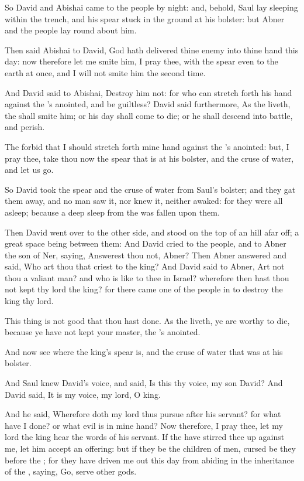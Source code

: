 \verse So David and Abishai came to the people by night: and, behold, Saul lay sleeping within the trench, and his spear stuck in the ground at his bolster: but Abner and the people lay round about him.

\verse Then said Abishai to David, God hath delivered thine enemy into thine hand this day: now therefore let me smite him, I pray thee, with the spear even to the earth at once, and I will not smite him the second time.

\verse And David said to Abishai, Destroy him not: for who can stretch forth his hand against the \LORD's anointed, and be guiltless?  \verse David said furthermore, As the \LORD liveth, the \LORD shall smite him; or his day shall come to die; or he shall descend into battle, and perish.

\verse The \LORD forbid that I should stretch forth mine hand against the \LORD's anointed: but, I pray thee, take thou now the spear that is at his bolster, and the cruse of water, and let us go.

\verse So David took the spear and the cruse of water from Saul's bolster; and they gat them away, and no man saw it, nor knew it, neither awaked: for they were all asleep; because a deep sleep from the \LORD was fallen upon them.

\verse Then David went over to the other side, and stood on the top of an hill afar off; a great space being between them: \verse And David cried to the people, and to Abner the son of Ner, saying, Answerest thou not, Abner? Then Abner answered and said, Who art thou that criest to the king?  \verse And David said to Abner, Art not thou a valiant man? and who is like to thee in Israel? wherefore then hast thou not kept thy lord the king? for there came one of the people in to destroy the king thy lord.

\verse This thing is not good that thou hast done. As the \LORD liveth, ye are worthy to die, because ye have not kept your master, the \LORD's anointed.

And now see where the king's spear is, and the cruse of water that was at his bolster.

\verse And Saul knew David's voice, and said, Is this thy voice, my son David? And David said, It is my voice, my lord, O king.

\verse And he said, Wherefore doth my lord thus pursue after his servant?  for what have I done? or what evil is in mine hand?  \verse Now therefore, I pray thee, let my lord the king hear the words of his servant. If the \LORD have stirred thee up against me, let him accept an offering: but if they be the children of men, cursed be they before the \LORD; for they have driven me out this day from abiding in the inheritance of the \LORD, saying, Go, serve other gods.

